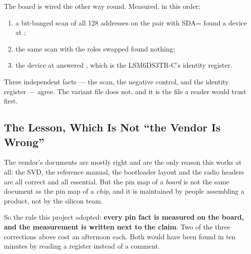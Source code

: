 The board is wired the other way round. Measured, in this order:

\begin{enumerate}
    \item a bit-banged scan of all 128 addresses on the pair  with
          SDA= found a device at ;
    \item the same scan with the roles swapped found nothing;
    \item the device at  answered , which is the
          LSM6DS3TR-C's identity register.
\end{enumerate}

Three independent facts — the scan, the negative control, and the identity register — agree. The
variant file does not, and it is the file a reader would trust first.

\subsection{The Lesson, Which Is Not ``the Vendor Is Wrong''}

The vendor's documents are mostly right and are the only reason this works at all: the SVD, the
reference manual, the bootloader layout and the radio headers are all correct and all essential. But
the pin map of a \emph{board} is not the same document as the pin map of a \emph{chip}, and it is
maintained by people assembling a product, not by the silicon team.

So the rule this project adopted: \textbf{every pin fact is measured on the board, and the
measurement is written next to the claim}. Two of the three corrections above cost an afternoon
each. Both would have been found in ten minutes by reading a register instead of a comment.
